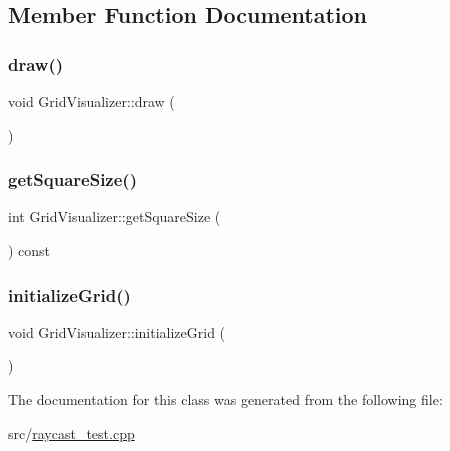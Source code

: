 \subsection{Member Function Documentation}
\mbox{\label{classGridVisualizer_abff2eaff8b5a6437a1e6b709b9bb3e28}} 
\subsubsection{\texorpdfstring{draw()}{draw()}}
{\footnotesize\ttfamily void Grid\+Visualizer\+::draw (\begin{DoxyParamCaption}{ }\end{DoxyParamCaption})\hspace{0.3cm}{\ttfamily [inline]}}

\mbox{\label{classGridVisualizer_aba463eb8e37c7c12b80faacc9ee4665b}} 
\subsubsection{\texorpdfstring{get\+Square\+Size()}{getSquareSize()}}
{\footnotesize\ttfamily int Grid\+Visualizer\+::get\+Square\+Size (\begin{DoxyParamCaption}{ }\end{DoxyParamCaption}) const\hspace{0.3cm}{\ttfamily [inline]}}

\mbox{\label{classGridVisualizer_ac47a55b7422750af85e0d14ba789cc4a}} 
\subsubsection{\texorpdfstring{initialize\+Grid()}{initializeGrid()}}
{\footnotesize\ttfamily void Grid\+Visualizer\+::initialize\+Grid (\begin{DoxyParamCaption}{ }\end{DoxyParamCaption})\hspace{0.3cm}{\ttfamily [inline]}}



The documentation for this class was generated from the following file\+:\begin{DoxyCompactItemize}
\item 
src/\hyperlink{raycast__test_8cpp}{raycast\+\_\+test.\+cpp}\end{DoxyCompactItemize}
